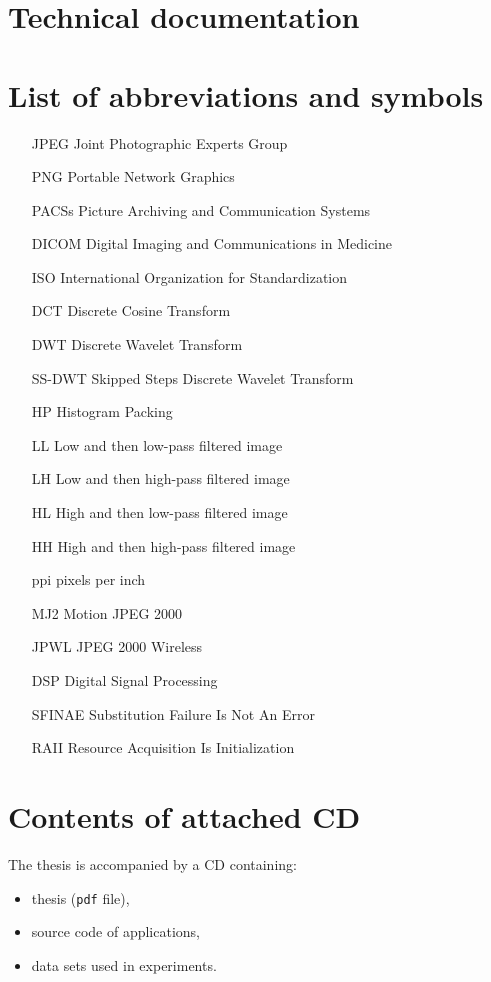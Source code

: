 \chapter*{Technical documentation}

\chapter*{List of abbreviations and symbols}

\begin{itemize}
\item[JPEG] Joint Photographic Experts Group
\item[PNG] Portable Network Graphics
\item[PACSs] Picture Archiving and Communication Systems
\item[DICOM] Digital Imaging and Communications in Medicine
\item[ISO] International Organization for Standardization
\item[DCT] Discrete Cosine Transform
\item[DWT] Discrete Wavelet Transform
\item[SS-DWT] Skipped Steps Discrete Wavelet Transform
\item[HP] Histogram Packing
\item[LL] Low and then low-pass filtered image
\item[LH] Low and then high-pass filtered image
\item[HL] High and then low-pass filtered image
\item[HH] High and then high-pass filtered image
\item[ppi] pixels per inch
\item[MJ2] Motion JPEG 2000
\item[JPWL] JPEG 2000 Wireless
\item[DSP] Digital Signal Processing
\item[SFINAE] Substitution Failure Is Not An Error
\item[RAII] Resource Acquisition Is Initialization
\end{itemize}

\chapter*{Contents of attached CD}

The thesis is accompanied by a CD containing:
\begin{itemize}
\item thesis (\texttt{pdf} file),
\item source code of applications,
\item data sets used in experiments.
\end{itemize}
